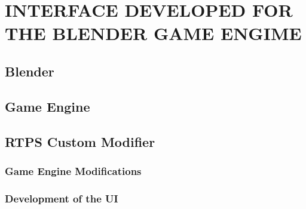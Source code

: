 \chapter{INTERFACE DEVELOPED FOR THE BLENDER GAME ENGIME}

\section{Blender}

\section{Game Engine}

\section{RTPS Custom Modifier}

\subsection{Game Engine Modifications}

\subsection{Development of the UI}


